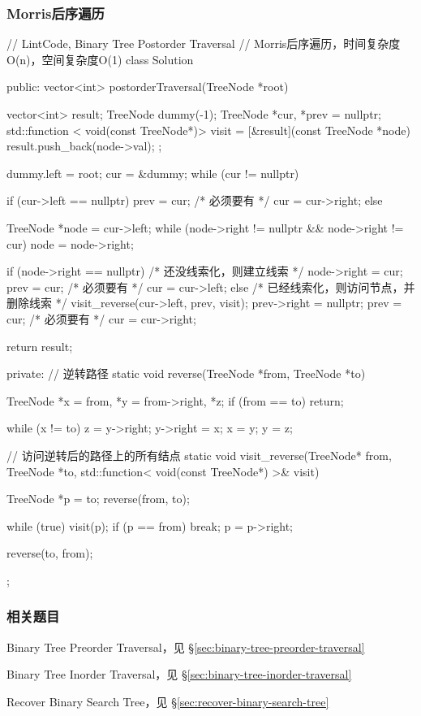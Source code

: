 \subsubsection{Morris后序遍历}
\begin{Code}
// LintCode, Binary Tree Postorder Traversal
// Morris后序遍历，时间复杂度O(n)，空间复杂度O(1)
class Solution {
public:
    vector<int> postorderTraversal(TreeNode *root) {
        vector<int> result;
        TreeNode dummy(-1);
        TreeNode *cur, *prev = nullptr;
        std::function < void(const TreeNode*)> visit = 
            [&result](const TreeNode *node){
            result.push_back(node->val); 
        };

        dummy.left = root;
        cur = &dummy;
        while (cur != nullptr) {
            if (cur->left == nullptr) {
                prev = cur; /* 必须要有 */
                cur = cur->right;
            } else {
                TreeNode *node = cur->left;
                while (node->right != nullptr && node->right != cur)
                    node = node->right;

                if (node->right == nullptr) { /* 还没线索化，则建立线索 */
                    node->right = cur;
                    prev = cur; /* 必须要有 */
                    cur = cur->left;
                } else { /* 已经线索化，则访问节点，并删除线索  */
                    visit_reverse(cur->left, prev, visit);
                    prev->right = nullptr;
                    prev = cur; /* 必须要有 */
                    cur = cur->right;
                }
            }
        }
        return result;
    }
private:
    // 逆转路径
    static void reverse(TreeNode *from, TreeNode *to) {
        TreeNode *x = from, *y = from->right, *z;
        if (from == to) return;

        while (x != to) {
            z = y->right;
            y->right = x;
            x = y;
            y = z;
        }
    }

    // 访问逆转后的路径上的所有结点
    static void visit_reverse(TreeNode* from, TreeNode *to, 
                     std::function< void(const TreeNode*) >& visit) {
        TreeNode *p = to;
        reverse(from, to);

        while (true) {
            visit(p);
            if (p == from)
                break;
            p = p->right;
        }

        reverse(to, from);
    }
};
\end{Code}


\subsubsection{相关题目}
\begindot
\item Binary Tree Preorder Traversal，见 \S \ref{sec:binary-tree-preorder-traversal}
\item Binary Tree Inorder Traversal，见 \S \ref{sec:binary-tree-inorder-traversal}
\item Recover Binary Search Tree，见 \S \ref{sec:recover-binary-search-tree}
\myenddot


